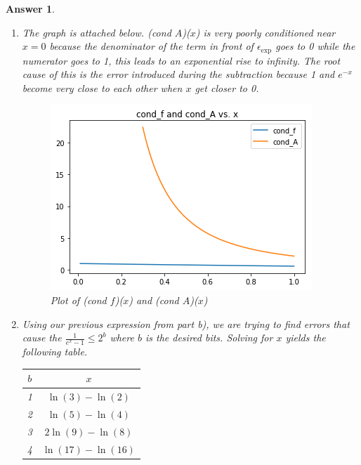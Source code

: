 \documentclass[12pt]{article}
\theoremstyle{colon}
\newtheorem*{answer}{Answer}
\begin{document}
\begin{answer}
\begin{enumerate}[label=\alph*)]
      From here, we have a monotonically decreasing function that is greater than 1 when we let $x=1$, thus it is greater than 1 for $x \in [0,1]$.

    \item The graph is attached below. (cond $A$)($x$) is very poorly conditioned near $x=0$ because the denominator of the term in front of $\epsilon_{\text{exp}}$ goes to 0 while the numerator goes to 1, this leads to an exponential rise to infinity. The root cause of this is the error introduced during the subtraction because 1 and $e^{-x}$ become very close to each other when $x$ get closer to 0.

      \begin{figure}[H]
        \centering
          \includegraphics[width=\textwidth]{q3c.png}
        \caption{Plot of (cond $f$)($x$) and (cond $A$)($x$)}
      \end{figure}

    \item Using our previous expression from part b), we are trying to find errors that cause the $\frac{1}{e^x-1} \leq 2^b$ where $b$ is the desired bits. Solving for $x$ yields the following table.

      \begin{center}
        \begin{tabular}{ c | c }
          $b$ & $x$ \\
          \hline
          1 & $\ln(3)-\ln(2)$ \\
          2 & $\ln(5)-\ln(4)$ \\
          3 & $2\ln(9)-\ln(8)$ \\
          4 & $\ln(17)-\ln(16)$\\
        \end{tabular}
      \end{center}


\end{enumerate}
\end{answer}
\end{document}
